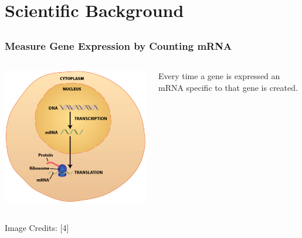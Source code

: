 \documentclass{beamer}
\begin{document}
\setcounter{subsection}{0}
\section{Scientific Background}
\subsection{}

\begin{frame}
  \frametitle{}
  \begin{center}
  {\color{blue}{\Huge
      Scientific Background
  }}
  \end{center}
\end{frame}


\begin{frame}
  \frametitle{Measure Gene Expression by Counting mRNA}
  \begin{columns}
    \begin{column}{0.48\textwidth}
      \begin{center}
        \includegraphics[scale=.35]{ribo.jpg}
      \end{center}
    \end{column}
    \begin{column}{0.48\textwidth}
      Every time a gene is expressed an mRNA specific to that gene is created. 
    \end{column}
  \end{columns}
      {\tiny Image Credits: [4]}
\end{frame}
\end{document}
